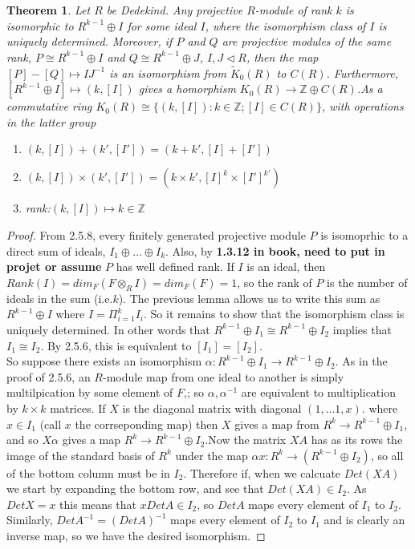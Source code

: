 \documentclass[a4paper,10pt]{article}
\newtheorem{thm}{Theorem}[subsection]
\begin{document}
\begin{thm}
Let $R$ be Dedekind. Any projective $R$-module of rank $k$ is isomorphic to $R^{k-1}\oplus I$ for some ideal $I$, where the isomorphism class of $I$ is uniquely determined. Moreover, if $P$ and $Q$ are projective modules of the same rank, $P\cong R^{k-1}\oplus I$ and $Q\cong R^{k-1}\oplus J$, $I,J\triangleleft R$, then the map $[P]-[Q]\mapsto IJ^{-1}$ is an isomorphism from $\tilde{K}_{0}(R)$ to $C(R)$. \newline Furthermore, $[R^{k-1}\oplus I]\mapsto (k,[I])$ gives a homorphism $K_{0}(R)\rightarrow \mathbb{Z}\oplus C(R)$.\newline As a commutative ring $K_{0}(R)\cong\{(k,[I]):k\in \mathbb{Z}; [I]\in C(R)\}$, with operations in the latter group
\begin{enumerate}
\item $(k,[I])+(k',[I'])=(k+k',[I]+[I'])$
\item $(k,[I])\times (k',[I'])=(k\times k',[I]^{k}\times [I']^{k'})$
\item rank:$(k,[I])\mapsto k\in \mathbb{Z}$
\end{enumerate}
\end{thm}
\begin{proof}
From 2.5.8, every finitely generated projective module $P$ is isomoprhic to a direct sum of ideals, $I_{1}\oplus\ldots\oplus I_{k}$. Also, by \textbf{1.3.12 in book, need to put in projet or assume} $P$ has well defined rank. If $I$ is an ideal, then $Rank(I)=dim_{F}(F\otimes_{R}I)=dim_{F}(F)=1$, so the rank of $P$ is the number of ideals in the sum (i.e.$k$). The previous lemma allows us to write this sum as $R^{k-1}\oplus I$ where $I=\Pi_{i=1}^{k}I_{i}$. So it remains to show that the isomorphism class is uniquely determined. In other words that $R^{k-1}\oplus I_{1}\cong R^{k-1}\oplus I_{2}$ implies that $I_{1}\cong I_{2}$. By 2.5.6, this is equivalent to $[I_{1}]=[I_{2}]$.
\\ So suppose there exists an isomorphism $\alpha:R^{k-1}\oplus I_{1}\rightarrow R^{k-1}\oplus I_{2}$. As in the proof of 2.5.6, an $R$-module map from one ideal to another is simply multilpication by some element of $F$,; so $\alpha, \alpha^{-1}$ are equivalent to multiplication by $k\times k$ matrices. If $X$ is the diagonal matrix with diagonal $(1,\ldots 1,x)$. where $x\in I_{1}$ (call $x$ the corrseponding map) then $X$ gives a map from $R^{k}\rightarrow R^{k-1}\oplus I_{1}$, and so $X\alpha$ gives a map $R^{k}\rightarrow R^{k-1}\oplus I_{2}$.\newline Now the matrix $XA$ has as its rows the image of the standard basis of $R^{k}$ under the map $\alpha x:R^{k}\rightarrow (R^{k-1}\oplus I_{2})$, so all of the bottom column must be in $I_{2}$. Therefore if, when we calcuate $Det(XA)$ we start by expanding the bottom row, and see that $Det(XA)\in I_{2}$. As $DetX=x$ this means that $xDetA\in I_{2}$, so $DetA$ maps every element of $I_{1}$ to $I_{2}$.
\\ Similarly, $DetA^{-1}=(DetA)^{-1}$ maps every element of $I_{2}$ to $I_{1}$ and is clearly an inverse map, so we have the desired isomorphism.
\end{proof}
\end{document}
